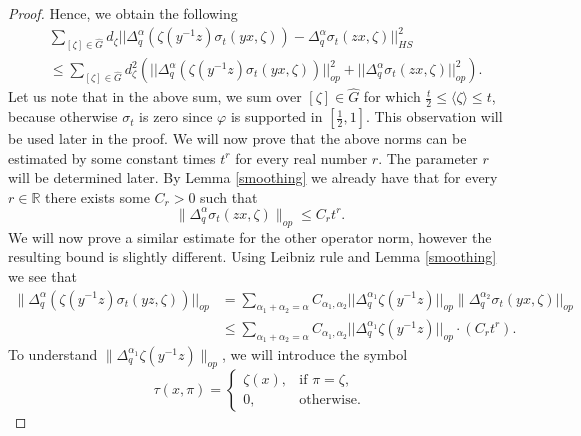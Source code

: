 \documentclass[12pt, reqno]{amsart}
\theoremstyle{definition}
\theoremstyle{remark}
\numberwithin{equation}{section}
\begin{document}
\begin{proof}
Hence, we obtain the following
    \begin{equation*}
        \begin{aligned}
            &\sum_{[\zeta]\in\widehat{G}}d_\zeta||\Delta_{q}^{\alpha}(\zeta(y^{-1}z)\sigma_t(yx,\zeta))-\Delta_{q}^{\alpha}\sigma_t(zx,\zeta)||^{2}_{HS}\\&\leq\sum_{[\zeta]\in\widehat{G}}d_\zeta^2(||\Delta_{q}^{\alpha}(\zeta(y^{-1}z)\sigma_t(yx,\zeta))||^2_{op}+||\Delta_{q}^{\alpha}\sigma_t(zx,\zeta)||^{2}_{op}).
        \end{aligned}
    \end{equation*}
    Let us note that in the above sum, we sum over $[\zeta]\in\widehat{G}$ for which $\frac{t}{2}\leq\langle\zeta\rangle\leq t$, because otherwise $\sigma_t$ is zero since $\varphi$ is supported in $[\frac{1}{2},1]$. This observation will be used later in the proof. We will now prove that the above norms can be estimated by some constant times $t^r$ for every real number $r$. The parameter $r$ will be determined later. By Lemma \ref{smoothing} we already have that for every $r\in\mathbb{R}$ there exists some $C_r>0$ such that
    \begin{equation*}
        \|\Delta_{q}^{\alpha}\sigma_t(zx,\zeta)\|_{op}\leq C_rt^{r}.
    \end{equation*}
    We will now prove a similar estimate for the other operator norm, however the resulting bound is slightly different. Using Leibniz rule and Lemma \ref{smoothing} we see that
    \begin{equation*}
    \begin{aligned}
         \|\Delta_{q}^{\alpha}(\zeta(y^{-1}z)\sigma_t(yz,\zeta))||_{op}&=\sum_{\alpha_1+\alpha_2=\alpha}C_{\alpha_1,\alpha_2}||\Delta_{q}^{\alpha_1}\zeta(y^{-1}z)||_{op}\|\Delta_{q}^{\alpha_2}\sigma_t(yx,\zeta)||_{op}\\
         &\leq\sum_{\alpha_1+\alpha_2=\alpha}C_{\alpha_1,\alpha_2}||\Delta_{q}^{\alpha_1}\zeta(y^{-1}z)||_{op}\cdot(C_r t^{r}).
    \end{aligned}
    \end{equation*}
To understand $\|\Delta_{q}^{\alpha_1}\zeta(y^{-1}z)\|_{op}$, we will introduce the symbol
    \begin{equation*}
        \tau(x,\pi)=
\begin{cases}
\zeta(x), & \text{if } \pi=\zeta,\\
0,        & \text{otherwise}.
\end{cases}
    \end{equation*}

\end{proof}
\end{document}
